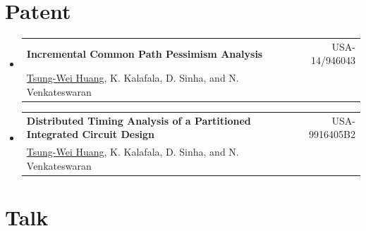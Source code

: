 \documentclass[A4,11pt]{article}
\makeatletter
\newcommand{\CVSubheading}[4]{
  \vspace{-2pt}\item
    \begin{tabular*}{0.97\textwidth}[t]{l@{\extracolsep{\fill}}r}
      \textbf{#1} & #2 \\
      \small#3 & \small #4 \\
    \end{tabular*}\vspace{-7pt}
}
\newcommand{\CVSubHeadingListStart}{\begin{itemize}[leftmargin=0.5cm, label={}]}
\newcommand{\CVSubHeadingListEnd}{\end{itemize}}
\makeatother
\begin{document}
\section{Patent}
  \CVSubHeadingListStart
    \CVSubheading %
     {Incremental Common Path Pessimism Analysis}{USA-14/946043}
     {\underline{Tsung-Wei Huang}, K. Kalafala, D. Sinha, and N. Venkateswaran}{}
    \CVSubheading %
     {Distributed Timing Analysis of a Partitioned Integrated Circuit Design}{USA-9916405B2}
     {\underline{Tsung-Wei Huang}, K. Kalafala, D. Sinha, and N. Venkateswaran}{}
  \CVSubHeadingListEnd  

\section{Talk}
\end{document}
